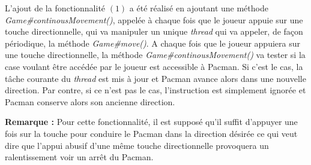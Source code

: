 \documentclass[12pt, openany]{report}
\begin{document}
L'ajout de la fonctionnalité $(1)$ a été réalisé en ajoutant une méthode \mbox{\textit{Game\#continousMovement()}}, appelée à chaque fois que le joueur appuie sur une touche directionnelle, qui va manipuler un unique \textit{thread} qui va appeler, de façon périodique, la méthode \mbox{\textit{Game\#move()}}. A chaque fois que le joueur appuiera sur une touche directionnelle, la méthode \mbox{\textit{Game\#continousMovement()}} va tester si la case voulant être accédée par le joueur est accessible à Pacman. Si c'est le cas, la tâche courante du \textit{thread} est mis à jour et Pacman avance alors dans une nouvelle direction. Par contre, si ce n'est pas le cas, l'instruction est simplement ignorée et Pacman conserve alors son ancienne direction. 

\textbf{Remarque :} Pour cette fonctionnalité, il est supposé qu'il suffit d'appuyer une fois sur la touche pour conduire le Pacman dans la direction désirée ce qui veut dire que l'appui abusif d'une même touche directionnelle provoquera un ralentissement voir un arrêt du Pacman.
\end{document}
